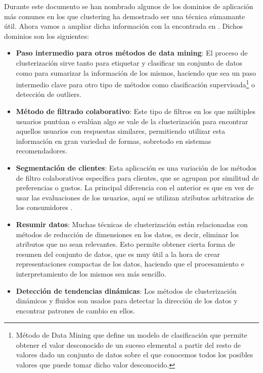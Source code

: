 \documentclass[10pt, a4paper]{article}
\begin{document}
Durante este documento se han nombrado algunos de los dominios de aplicación más comunes en los que clustering ha demostrado ser una técnica súmamante útil. Ahora vamos a ampliar dicha información con la encontrada en \cite{otrolibro}. Dichos dominios son los siguientes:

\begin{itemize}
  \item \textbf{Paso intermedio para otros métodos de data mining}: El proceso de clusterización sirve tanto para etiquetar y clasificar un conjunto de datos como para sumarizar la información de los mismos, haciendo que sea un paso intermedio clave para otro tipo de métodos como clasificación supervisada\footnote{Método de Data Mining que define un modelo de clasificación que permite obtener el valor desconocido de un suceso elemental a partir del resto de valores dado un conjunto de datos sobre el que conocemos todos los posibles valores que puede tomar dicho valor desconocido.} o detección de outliers.
  
  \item \textbf{Método de filtrado colaborativo}: Este tipo de filtros en los que múltiples usuarios puntúan o evalúan algo se vale de la clusterización para encontrar aquellos usuarios con respuestas similares, permitiendo utilizar esta información en gran variedad de formas, sobretodo en sistemas recomendadores.
  
  \item \textbf{Segmentación de clientes}: Esta aplicación es una variación de los métodos de filtro colaborativos específica para clientes, que se agrupan por similitud de preferencias o gustos. La principal diferencia con el anterior es que en vez de usar las evaluaciones de los usuarios, aquí se utilizan atributos arbitrarios de los consumidores \cite{13}.
  
  \item \textbf{Resumir datos}: Muchas técnicas de clusterización están relacionadas con métodos de reducción de dimensiones en los datos, es decir, eliminar los atributos que no sean relevantes. Esto permite obtener cierta forma de resumen del conjunto de datos, que es muy útil a la hora de crear representaciones compactas de los datos, haciendo que el procesamiento e interpretamiento de los mismos sea más sencillo.
  
  \item \textbf{Detección de tendencias dinámicas}: Los métodos de clusterización dinámicos y fluidos son usados para detectar la dirección de los datos y encontrar patrones de cambio en ellos.
  

\end{itemize}
\end{document}
